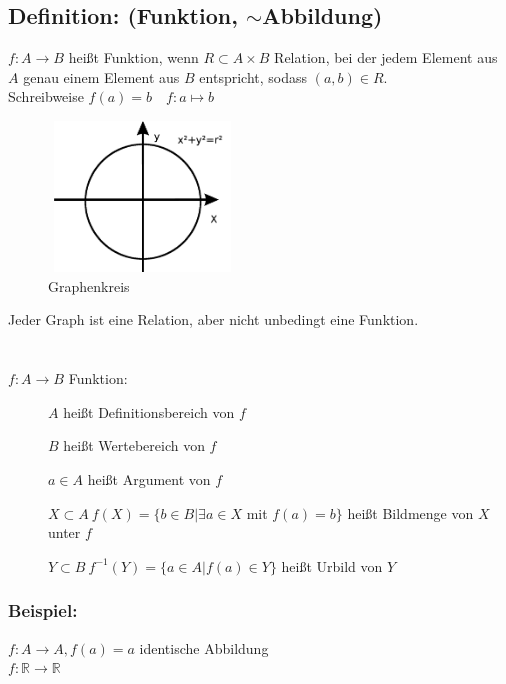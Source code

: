 \subsection{Definition: (Funktion,  $\sim$Abbildung)}
$f: A \rightarrow B$ heißt Funktion, wenn $R\subset A\times B$ Relation, bei der jedem Element aus $A$ genau einem Element aus $B$ entspricht, sodass $(a,b)\in R$.\\
Schreibweise $f(a)=b \quad f:a\mapsto b$\\
%
\begin{figure} [H]
	\centering 
	\includegraphics[width=5cm, height=4cm]{mainmatter/chapter0/pics/graphenkreis.png}
	\caption{Graphenkreis} 
\end{figure}
Jeder Graph ist eine Relation, aber nicht unbedingt eine Funktion.\\
\qquad\\
\qquad\\
%
$f: A\rightarrow B$ Funktion:
\begin{description}
	\item [] $A$ heißt Definitionsbereich von $f$
	\item [] $B$ heißt Wertebereich von $f$
	\item [] $a \in A$ heißt Argument von $f$
	\item [] $X \subset A ~ f(X)=\{b \in B|\exists a \in X$ mit $f(a)=b\}$ heißt Bildmenge 
		von	$X$ unter $f$
	\item [] $Y\subset B ~ f^{-1}(Y)=\{a \in A| f(a) \in Y\}$ heißt Urbild von $Y$
\end{description}
\subsubsection{Beispiel: }
$f: A \rightarrow A , f(a) = a$ identische Abbildung\\
$f: \mathbb{R} \rightarrow \mathbb{R}$
%
%
%

